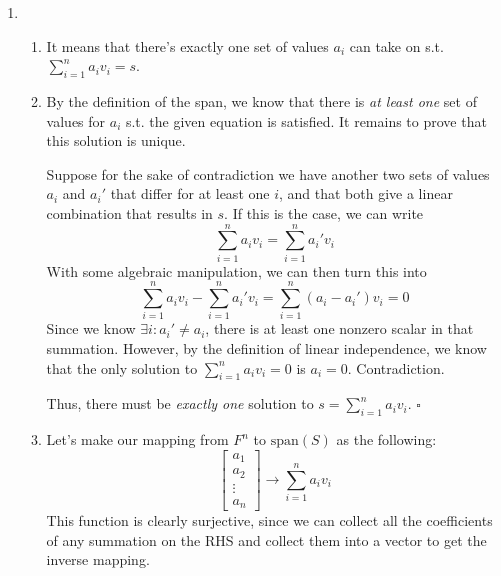 \documentclass[12pt]{article}
\begin{document}
\begin{enumerate}
    \item \begin{enumerate}
              \item It means that there's exactly one set of values $a_i$ can take on s.t. $\sum_{i=1}^n a_i v_i=s$.
              \item By the definition of the span, we know that there is
                    \textit{at least one} set of values for $a_i$ s.t. the given equation is satisfied.
                    It remains to prove that this solution is unique.

                    Suppose for the sake of contradiction we have another two sets of values $a_i$ and $a_i'$
                    that differ for at least one $i$, and that both give a linear combination that results in $s$.
                    If this is the case, we can write
                    \[\sum_{i=1}^n a_i v_i=\sum_{i=1}^n a_i' v_i\]
                    With some algebraic manipulation, we can then turn this into
                    \[\sum_{i=1}^n a_i v_i-\sum_{i=1}^n a_i' v_i=\sum_{i=1}^n (a_i-a_i')v_i=0\]
                    Since we know $\exists i: a_i' \ne a_i$, there is at least one nonzero scalar in that summation.
                    However, by the definition of linear independence, we know that the only solution
                    to $\sum_{i=1}^n a_i v_i=0$ is $a_i=0$. Contradiction.

                    Thus, there must be \textit{exactly one} solution to $s=\sum_{i=1}^n a_i v_i$. $\square$
              \item Let's make our mapping from $F^n$ to $\text{span}(S)$ as the following:
              \[\begin{bmatrix}
                a_1 \\ a_2 \\ \vdots \\ a_n
              \end{bmatrix} \rightarrow \sum_{i=1}^n a_i v_i\]
              This function is clearly surjective, since we can collect all the coefficients
              of any summation on the RHS and collect them into a vector to get the inverse mapping.


\end{enumerate}
\end{enumerate}
\end{document}
